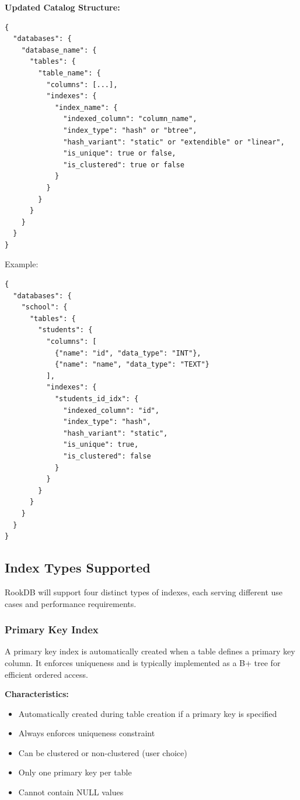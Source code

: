 \documentclass[11pt,a4paper]{article}
\begin{document}
\textbf{Updated Catalog Structure:}
\begin{lstlisting}
{
  "databases": {
    "database_name": {
      "tables": {
        "table_name": {
          "columns": [...],
          "indexes": {
            "index_name": {
              "indexed_column": "column_name",
              "index_type": "hash" or "btree",
              "hash_variant": "static" or "extendible" or "linear",
              "is_unique": true or false,
              "is_clustered": true or false
            }
          }
        }
      }
    }
  }
}
\end{lstlisting}

Example:
\begin{lstlisting}
{
  "databases": {
    "school": {
      "tables": {
        "students": {
          "columns": [
            {"name": "id", "data_type": "INT"},
            {"name": "name", "data_type": "TEXT"}
          ],
          "indexes": {
            "students_id_idx": {
              "indexed_column": "id",
              "index_type": "hash",
              "hash_variant": "static",
              "is_unique": true,
              "is_clustered": false
            }
          }
        }
      }
    }
  }
}
\end{lstlisting}


\subsection{Index Types Supported}

RookDB will support four distinct types of indexes, each serving different use cases and performance requirements.

\subsubsection{Primary Key Index}

A primary key index is automatically created when a table defines a primary key column. It enforces uniqueness and is typically implemented as a B+ tree for efficient ordered access.

\textbf{Characteristics:}
\begin{itemize}
\item Automatically created during table creation if a primary key is specified
\item Always enforces uniqueness constraint
\item Can be clustered or non-clustered (user choice)
\item Only one primary key per table
\item Cannot contain NULL values
\end{itemize}
\end{document}
